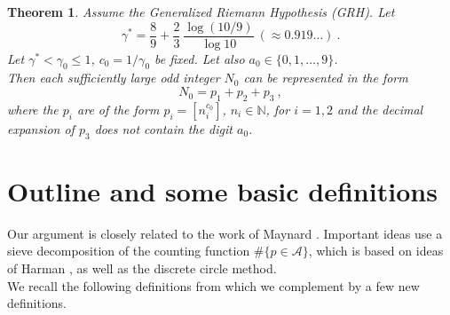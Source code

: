 \documentclass{amsart}
\newtheorem{theorem}{Theorem}[section]
\numberwithin{equation}{subsection}
\begin{document}
\begin{theorem}\label{thm11}
Assume the Generalized Riemann Hypothesis (GRH). Let 
$$\gamma^*=\frac{8}{9}+\frac{2}{3}\:\frac{\log(10/9)}{\log 10}\:(\approx 0.919\ldots)\:.$$
Let $\gamma^*<\gamma_0\leq 1$, $c_0=1/\gamma_0$ be fixed. Let also $a_0\in\{0,1,\ldots, 9\}$.\\
Then each sufficiently large odd integer $N_0$ can be represented in the form 
$$N_0=p_1+p_2+p_3\:,$$
where the $p_i$ are of the form $p_i=[n_i^{c_0}]$, $n_i\in\mathbb{N}$, for $i=1,2$ and the decimal expansion of $p_3$ does not contain the digit $a_0$.\\

\end{theorem}

\section{Outline and some basic definitions}

Our argument is closely related to the work of Maynard \cite{maynard}. Important ideas use a sieve decomposition of the counting function $\#\{p\in\mathcal{A}\}$, which is based on ideas of Harman \cite{harman}, as well as the discrete circle method.\\
We recall the following definitions from \cite{maynard} which we complement by a few new definitions.
\end{document}
